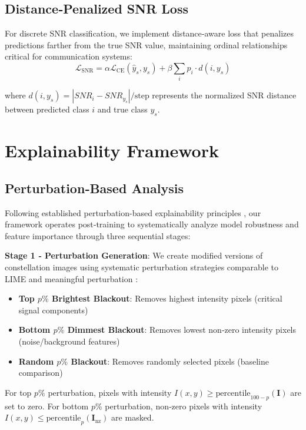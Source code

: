 \documentclass{ELSP}
\begin{document}
\subsection{Distance‑Penalized SNR Loss}

For discrete SNR classification, we implement distance‑aware loss that penalizes predictions farther from the true SNR value, maintaining ordinal relationships critical for communication systems:
\begin{equation}
\mathcal{L}_{\text{SNR}} = \alpha \mathcal{L}_{\text{CE}}(\hat{y}_s, y_s) + \beta \sum_{i} p_i \cdot d(i, y_s)
\end{equation}

where $d(i, y_s) = |SNR_i - SNR_{y_s}| / \text{step}$ represents the normalized SNR distance between predicted class $i$ and true class $y_s$.

\section{Explainability Framework}

\subsection{Perturbation‑Based Analysis}

Following established perturbation-based explainability principles \cite{fong2017interpretable,IVANOVS2021228}, our framework operates post‑training to systematically analyze model robustness and feature importance through three sequential stages:

\textbf{Stage 1 ‑ Perturbation Generation}: We create modified versions of constellation images using systematic perturbation strategies comparable to LIME \cite{10.1145/2939672.2939778} and meaningful perturbation \cite{fong2017interpretable}:
\begin{itemize}
\item \textbf{Top $p\%$ Brightest Blackout}: Removes highest intensity pixels (critical signal components)
\item \textbf{Bottom $p\%$ Dimmest Blackout}: Removes lowest non‑zero intensity pixels (noise/background features)  
\item \textbf{Random $p\%$ Blackout}: Removes randomly selected pixels (baseline comparison)
\end{itemize}

For top $p\%$ perturbation, pixels with intensity $I(x,y) \geq \text{percentile}_{100-p}(\mathbf{I})$ are set to zero. For bottom $p\%$ perturbation, non‑zero pixels with intensity $I(x,y) \leq \text{percentile}_p(\mathbf{I}_{\text{nz}})$ are masked.
\end{document}
